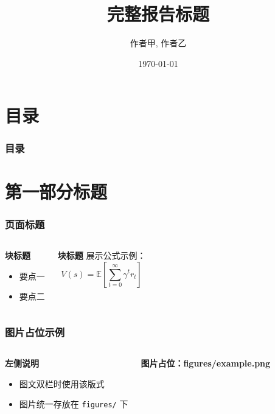 \documentclass[10pt,aspectratio=43,mathserif]{beamer}
\title[短标题]{\fontsize{13pt}{18pt}\selectfont 完整报告标题}
\author[页脚短作者]{作者甲, 作者乙 \\ \medskip}
\institute[短机构名]{完整机构名}
\date[\today]{\today}
\newcommand{\imageplaceholder}[2][2.5cm]{%
    \parbox[c][#1][c]{\linewidth}{%
        \centering\scriptsize\textcolor{black!60}{\textbf{图片占位：#2}}%
    }%
}
\begin{document}
\begin{frame}
    \titlepage
\end{frame}

\section*{目录}
\begin{frame}
    \frametitle{\textbf{目录}}
    \textbf{\tableofcontents}
\end{frame}

\section[第一部分]{第一部分标题}

\begin{frame}
    \frametitle{\textbf{页面标题}}
    \begin{columns}[T]
        \begin{block}{\textbf{块标题}}
            \begin{itemize}
                \item 要点一
                \item 要点二
            \end{itemize}
        \end{block}

        \begin{block}{\textbf{块标题}}
            展示公式示例：
            \[
                V(s)=\mathbb{E}\left[\sum_{t=0}^{\infty}\gamma^t r_t\right]
            \]
        \end{block}
    \end{columns}
\end{frame}

\begin{frame}
    \frametitle{\textbf{图片占位示例}}
    \begin{columns}[T]
        \begin{block}{\textbf{左侧说明}}
            \begin{itemize}
                \item 图文双栏时使用该版式
                \item 图片统一存放在 \texttt{figures/} 下
            \end{itemize}
        \end{block}

        \centering
        \imageplaceholder{figures/example.png}
    \end{columns}
\end{frame}
\end{document}
